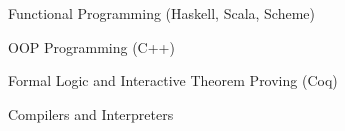 \divider


\divider



\begin{tightitemize}
    \item Functional Programming (Haskell, Scala, Scheme) 
    \item OOP Programming (C++)
    \item Formal Logic and Interactive Theorem Proving (Coq)
    \item Compilers and Interpreters
\end{tightitemize}

\medskip


